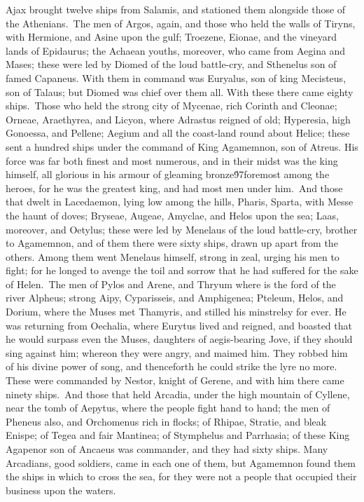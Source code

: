 {Ajax brought twelve ships from Salamis, and stationed them alongside those of the Athenians.\
The men of Argos, again, and those who held the walls of Tiryns, with Hermione, and Asine upon the gulf; Troezene, Eionae, and the vineyard lands of Epidaurus; the Achaean youths, moreover, who came from Aegina and Mases; these were led by Diomed of the loud battle-cry, and Sthenelus son of famed Capaneus. With them in command was Euryalus, son of king Mecisteus, son of Talaus; but Diomed was chief over them all. With these there came eighty ships.\
Those who held the strong city of Mycenae, rich Corinth and Cleonae; Orneae, Araethyrea, and Licyon, where Adrastus reigned of old; Hyperesia, high Gonoessa, and Pellene; Aegium and all the coast-land round about Helice; these sent a hundred ships under the command of King Agamemnon, son of Atreus. His force was far both finest and most numerous, and in their midst was the king himself, all glorious in his armour of gleaming bronze\'97foremost among the heroes, for he was the greatest king, and had most men under him.\
And those that dwelt in Lacedaemon, lying low among the hills, Pharis, Sparta, with Messe the haunt of doves; Bryseae, Augeae, Amyclae, and Helos upon the sea; Laas, moreover, and Oetylus; these were led by Menelaus of the loud battle-cry, brother to Agamemnon, and of them there were sixty ships, drawn up apart from the others. Among them went Menelaus himself, strong in zeal, urging his men to fight; for he longed to avenge the toil and sorrow that he had suffered for the sake of Helen.\
The men of Pylos and Arene, and Thryum where is the ford of the river Alpheus; strong Aipy, Cyparisseis, and Amphigenea; Pteleum, Helos, and Dorium, where the Muses met Thamyris, and stilled his minstrelsy for ever. He was returning from Oechalia, where Eurytus lived and reigned, and boasted that he would surpass even the Muses, daughters of aegis-bearing Jove, if they should sing against him; whereon they were angry, and maimed him. They robbed him of his divine power of song, and thenceforth he could strike the lyre no more. These were commanded by Nestor, knight of Gerene, and with him there came ninety ships.\
And those that held Arcadia, under the high mountain of Cyllene, near the tomb of Aepytus, where the people fight hand to hand; the men of Pheneus also, and Orchomenus rich in flocks; of Rhipae, Stratie, and bleak Enispe; of Tegea and fair Mantinea; of Stymphelus and Parrhasia; of these King Agapenor son of Ancaeus was commander, and they had sixty ships. Many Arcadians, good soldiers, came in each one of them, but Agamemnon found them the ships in which to cross the sea, for they were not a people that occupied their business upon the waters.\
}
